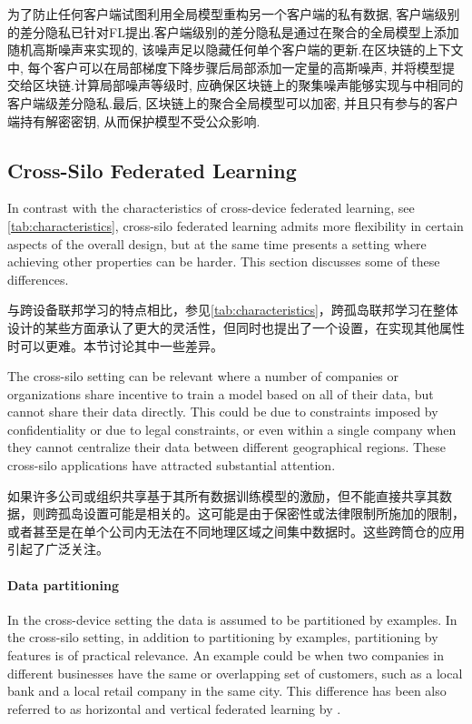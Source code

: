 为了防止任何客户端试图利用全局模型重构另一个客户端的私有数据, 客户端级别的差分隐私\citep{mcmahan18dplm}已针对FL提出.客户端级别的差分隐私是通过在聚合的全局模型上添加随机高斯噪声来实现的, 该噪声足以隐藏任何单个客户端的更新.在区块链的上下文中, 每个客户可以在局部梯度下降步骤后局部添加一定量的高斯噪声, 并将模型提交给区块链.计算局部噪声等级时, 应确保区块链上的聚集噪声能够实现与\citep{mcmahan18dplm}中相同的客户端级差分隐私.最后, 区块链上的聚合全局模型可以加密, 并且只有参与的客户端持有解密密钥, 从而保护模型不受公众影响.
% 
\subsection{Cross-Silo Federated Learning}
\label{ssec:cross-silo}

In contrast with the characteristics of cross-device federated learning, see \cref{tab:characteristics}, cross-silo federated learning admits more flexibility in certain aspects of the overall design, but at the same time presents a setting where achieving other properties can be harder. This section discusses some of these differences.

与跨设备联邦学习的特点相比，参见\cref{tab:characteristics}，跨孤岛联邦学习在整体设计的某些方面承认了更大的灵活性，但同时也提出了一个设置，在实现其他属性时可以更难。本节讨论其中一些差异。

The cross-silo setting can be relevant where a number of companies or organizations share incentive to train a model based on all of their data, but cannot share their data directly. This could be due to constraints imposed by confidentiality or due to legal constraints, or even within a single company when they cannot centralize their data between different geographical regions. These cross-silo applications have attracted substantial attention.

如果许多公司或组织共享基于其所有数据训练模型的激励，但不能直接共享其数据，则跨孤岛设置可能是相关的。这可能是由于保密性或法律限制所施加的限制，或者甚至是在单个公司内无法在不同地理区域之间集中数据时。这些跨筒仓的应用引起了广泛关注。

\paragraph{Data partitioning} In the cross-device setting the data is assumed to be partitioned by examples. In the cross-silo setting, in addition to partitioning by examples, partitioning by features is of practical relevance. An example could be when two companies in different businesses have the same or overlapping set of customers, such as a local bank and a local retail company in the same city. This difference has been also referred to as horizontal and vertical federated learning by \citet{DBLP:journals/corr/abs-1902-04885}.


